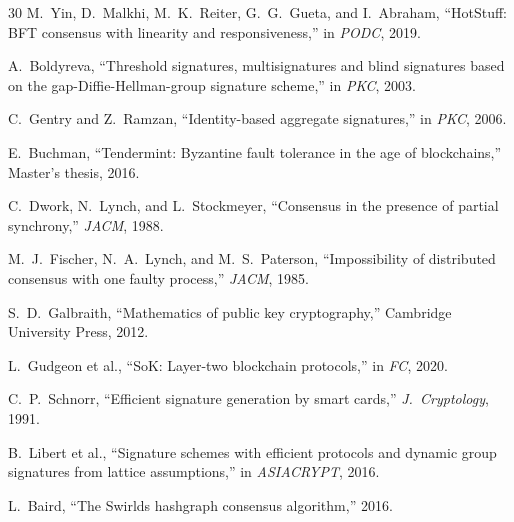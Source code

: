 \documentclass[11pt,a4paper]{article}
\begin{document}
\begin{thebibliography}{30}
M.~Yin, D.~Malkhi, M.~K.~Reiter, G.~G.~Gueta, and I.~Abraham, ``HotStuff: BFT consensus with linearity and responsiveness,'' in \emph{PODC}, 2019.

A.~Boldyreva, ``Threshold signatures, multisignatures and blind signatures based on the gap-Diffie-Hellman-group signature scheme,'' in \emph{PKC}, 2003.

C.~Gentry and Z.~Ramzan, ``Identity-based aggregate signatures,'' in \emph{PKC}, 2006.

E.~Buchman, ``Tendermint: Byzantine fault tolerance in the age of blockchains,'' Master's thesis, 2016.

C.~Dwork, N.~Lynch, and L.~Stockmeyer, ``Consensus in the presence of partial synchrony,'' \emph{JACM}, 1988.

M.~J.~Fischer, N.~A.~Lynch, and M.~S.~Paterson, ``Impossibility of distributed consensus with one faulty process,'' \emph{JACM}, 1985.

S.~D.~Galbraith, ``Mathematics of public key cryptography,'' Cambridge University Press, 2012.

L.~Gudgeon et al., ``SoK: Layer-two blockchain protocols,'' in \emph{FC}, 2020.

C.~P.~Schnorr, ``Efficient signature generation by smart cards,'' \emph{J.\ Cryptology}, 1991.

B.~Libert et al., ``Signature schemes with efficient protocols and dynamic group signatures from lattice assumptions,'' in \emph{ASIACRYPT}, 2016.

L.~Baird, ``The Swirlds hashgraph consensus algorithm,'' 2016.

\end{thebibliography}
\end{document}
